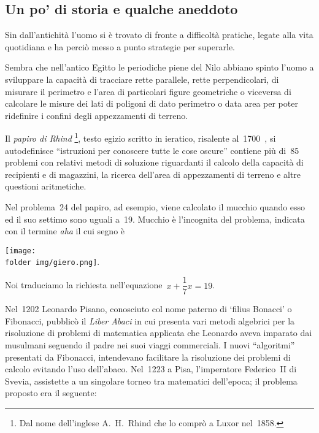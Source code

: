 \subsection{Un po' di storia e qualche aneddoto}
\label{subsec:equazioni_problemi_storia}

Sin dall'antichità l'uomo si è trovato di fronte a difficoltà pratiche, 
legate alla vita quotidiana e ha perciò messo a punto strategie per 
superarle.

Sembra che nell'antico Egitto le periodiche piene del
Nilo abbiano spinto l'uomo a sviluppare la capacità
di tracciare rette parallele, rette perpendicolari, di misurare il
perimetro e l'area di particolari figure geometriche o
viceversa di calcolare le misure dei lati di poligoni di dato perimetro
o data area per poter ridefinire i confini degli appezzamenti di
terreno.

Il \emph{papiro di Rhind} 
\footnote{Dal nome dell'inglese A.~H.~Rhind che lo comprò a Luxor nel~1858.}, 
testo egizio scritto in
ieratico, risalente al~1700~\aC, si autodefinisce
``istruzioni per conoscere tutte le cose
oscure'' contiene più di~85 problemi con relativi
metodi di soluzione riguardanti il calcolo della capacità di
recipienti e di magazzini, la ricerca dell'area di
appezzamenti di terreno e altre questioni aritmetiche.

Nel problema~24 del papiro, ad esempio, viene calcolato il mucchio
quando esso ed il suo settimo sono uguali a~19. Mucchio è
l'incognita del problema, indicata con il termine
\emph{aha} il cui segno è
% 
\begin{inaccessibleblock}[Geroglifico]
\texttt{[image: \\folder img/giero.png]}.
\end{inaccessibleblock}
                                                              
Noi traduciamo la richiesta nell'equazione~\(x+\dfrac{1}{7}x=19\).

 
Nel~1202 Leonardo Pisano, conosciuto col nome paterno di
`filius Bonacci' o Fibonacci, pubblicò il \emph{Liber Abaci} 
in cui presenta vari metodi algebrici per la risoluzione di problemi di 
matematica applicata che Leonardo aveva imparato 
dai musulmani seguendo il padre nei suoi viaggi commerciali. 
I nuovi ``algoritmi'' presentati da Fibonacci, intendevano facilitare la 
risoluzione dei problemi di calcolo evitando l'uso dell'abaco. 
Nel~1223 a Pisa, l'imperatore Federico~II di Svevia, assistette a
un singolare torneo tra matematici dell'epoca; il problema proposto era 
il seguente:

